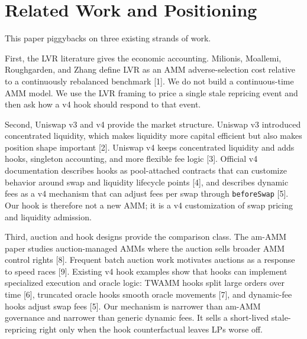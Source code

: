 \documentclass[11pt]{article}
\begin{document}
\section{Related Work and Positioning}
This paper piggybacks on three existing strands of work.

First, the LVR literature gives the economic accounting. Milionis, Moallemi, Roughgarden, and Zhang define LVR as an AMM adverse-selection cost relative to a continuously rebalanced benchmark [1]. We do not build a continuous-time AMM model. We use the LVR framing to price a single stale repricing event and then ask how a v4 hook should respond to that event.

Second, Uniswap v3 and v4 provide the market structure. Uniswap v3 introduced concentrated liquidity, which makes liquidity more capital efficient but also makes position shape important [2]. Uniswap v4 keeps concentrated liquidity and adds hooks, singleton accounting, and more flexible fee logic [3]. Official v4 documentation describes hooks as pool-attached contracts that can customize behavior around swap and liquidity lifecycle points [4], and describes dynamic fees as a v4 mechanism that can adjust fees per swap through \texttt{beforeSwap} [5]. Our hook is therefore not a new AMM; it is a v4 customization of swap pricing and liquidity admission.

Third, auction and hook designs provide the comparison class. The am-AMM paper studies auction-managed AMMs where the auction sells broader AMM control rights [8]. Frequent batch auction work motivates auctions as a response to speed races [9]. Existing v4 hook examples show that hooks can implement specialized execution and oracle logic: TWAMM hooks split large orders over time [6], truncated oracle hooks smooth oracle movements [7], and dynamic-fee hooks adjust swap fees [5]. Our mechanism is narrower than am-AMM governance and narrower than generic dynamic fees. It sells a short-lived stale-repricing right only when the hook counterfactual leaves LPs worse off.
\end{document}
